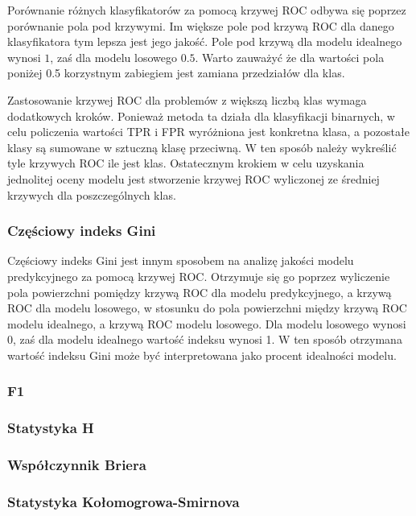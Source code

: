 \documentclass[a4paper, twoside, 11pt, openright]{article}
\begin{document}
Porównanie różnych klasyfikatorów za pomocą krzywej ROC odbywa się poprzez porównanie pola pod krzywymi. Im większe pole pod krzywą ROC dla danego klasyfikatora tym lepsza jest jego jakość. Pole pod krzywą dla modelu idealnego wynosi $1$, zaś dla modelu losowego $0.5$. Warto zauważyć że dla wartości pola poniżej 0.5  korzystnym zabiegiem jest zamiana przedziałów dla klas.

\bigskip

Zastosowanie krzywej ROC dla problemów z większą liczbą klas wymaga dodatkowych kroków. Ponieważ metoda ta działa dla klasyfikacji binarnych, w celu policzenia wartości TPR i FPR wyróżniona jest konkretna klasa, a pozostałe klasy są sumowane w sztuczną klasę przeciwną. W ten sposób należy wykreślić tyle krzywych ROC ile jest klas. Ostatecznym krokiem w celu uzyskania jednolitej oceny modelu jest stworzenie krzywej ROC wyliczonej ze średniej krzywych dla poszczególnych klas.


\subsubsection{Częściowy indeks Gini}

Częściowy indeks Gini jest innym sposobem na analizę jakości modelu predykcyjnego za pomocą krzywej ROC. Otrzymuje się go poprzez wyliczenie pola powierzchni pomiędzy krzywą ROC dla modelu predykcyjnego, a krzywą ROC dla modelu losowego, w stosunku do pola powierzchni między krzywą ROC modelu idealnego, a krzywą ROC modelu losowego. Dla modelu losowego wynosi 0, zaś dla modelu idealnego wartość indeksu wynosi 1. W ten sposób otrzymana wartość indeksu Gini może być interpretowana jako procent idealności modelu.

\subsubsection{F1}


\subsubsection{Statystyka H}

\subsubsection{Współczynnik Briera}

\subsubsection{Statystyka Kołomogrowa-Smirnova}
\end{document}
